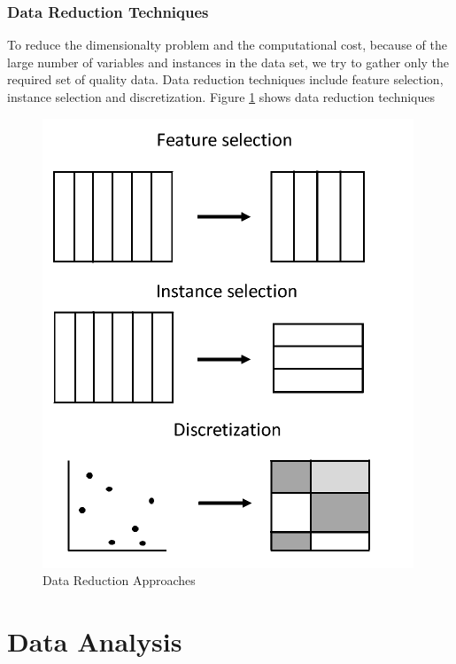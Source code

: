 \documentclass[sigconf]{acmart}
\begin{document}
\subsubsection{Data Reduction Techniques}

To reduce the dimensionalty problem and the computational cost, because of the large number of variables and instances in the data set, we try to gather only the required set of quality data. Data reduction techniques include feature selection, instance selection and discretization. Figure \ref{fig:Figure5} shows data reduction techniques \cite{preprocessing}

\begin{figure}[htb]
  \centering
  \includegraphics[width=1.0\columnwidth]{project/images/Figure5.png}
  \caption{Data Reduction Approaches
  \cite{preprocessing}}
  \label{fig:Figure5} 
\end{figure}


\section{Data Analysis}
\end{document}
